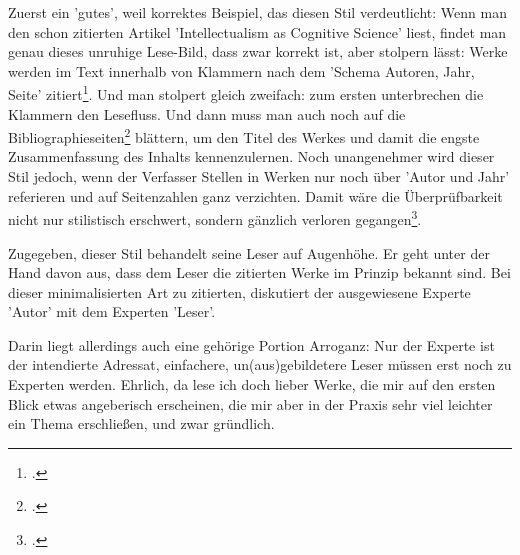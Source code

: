 Zuerst ein 'gutes', weil korrektes Beispiel, das diesen Stil verdeutlicht: Wenn
man den schon zitierten Artikel 'Intellectualism as Cognitive Science' liest,
findet man genau dieses unruhige Lese-Bild, dass zwar korrekt ist, aber stolpern
lässt: Werke werden im Text innerhalb von Klammern nach dem 'Schema Autoren,
Jahr, Seite' zitiert\footcite[vgl.][25]{RotCum2011a}. Und man stolpert gleich
zweifach: zum ersten unterbrechen die Klammern den Lesefluss. Und dann muss man
auch noch auf die Bibliographieseiten\footcite[vgl.][38f]{RotCum2011a} blättern,
um den Titel des Werkes und damit die engste Zusammenfassung des Inhalts
kennenzulernen. Noch unangenehmer wird dieser Stil jedoch, wenn der Verfasser
Stellen in Werken nur noch über 'Autor und Jahr' referieren und auf Seitenzahlen
ganz verzichten. Damit wäre die Überprüfbarkeit nicht nur stilistisch erschwert,
sondern gänzlich verloren gegangen\footcite[vgl. z.B.][151]{Bechtel2011a}.

Zugegeben, dieser Stil behandelt seine Leser auf Augenhöhe. Er geht unter der
Hand davon aus, dass dem Leser die zitierten Werke im Prinzip bekannt sind. Bei
dieser minimalisierten Art zu zitierten, diskutiert der ausgewiesene Experte
'Autor' mit dem Experten 'Leser'.

Darin liegt allerdings auch eine gehörige Portion Arroganz: Nur der Experte ist
der intendierte Adressat, einfachere, un\-(aus)\-ge\-bil\-de\-te\-re Leser
müssen erst noch zu Experten werden. Ehrlich, da lese ich doch lieber Werke, die
mir auf den ersten Blick etwas angeberisch erscheinen, die mir aber in der
Praxis sehr viel leichter ein Thema erschließen, und zwar gründlich.



%
